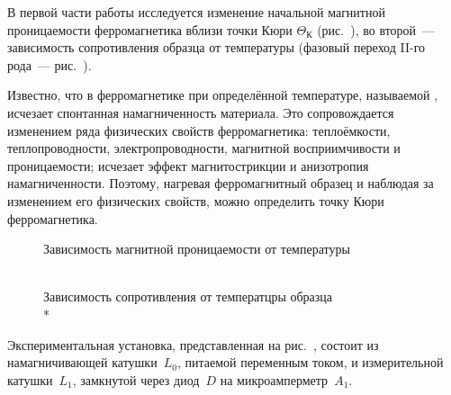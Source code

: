 






В первой части работы исследуется изменение начальной магнитной проницаемости
ферромагнетика вблизи точки Кюри $\Theta_{К}$ (рис.~), во второй~--- зависимость сопротивления образца
от температуры (фазовый переход II-го рода~--- рис.~).

Известно, что в ферромагнетике при определённой температуре, называемой
, исчезает спонтанная намагниченность материала. Это
сопровождается изменением ряда физических свойств ферромагнетика: теплоёмкости,
теплопроводности, электропроводности, магнитной восприимчивости и
проницаемости; исчезает эффект магнитострикции и анизотропия намагниченности.
Поэтому, нагревая ферромагнитный образец и наблюдая за изменением его физических
свойств, можно определить точку Кюри ферромагнетика.

\begin{figure}[h!]
    \begin{minipage}[b]{0.45\textwidth}\small
        \caption{Зависимость магнитной проницаемости от температуры\\ \ }
    \end{minipage}%
    \hfill
    \begin{minipage}[b]{0.5\textwidth}\small
        \caption{Зависимость сопротивления от температцры образца\\*}
    \end{minipage}%
\end{figure}



\experiment
Экспериментальная установка, представленная на рис.~, состоит из намагничивающей катушки~$L_0$,
питаемой переменным током, и измерительной катушки~$L_1$, замкнутой через 
диод~$D$ на микроамперметр~$A_1$.

